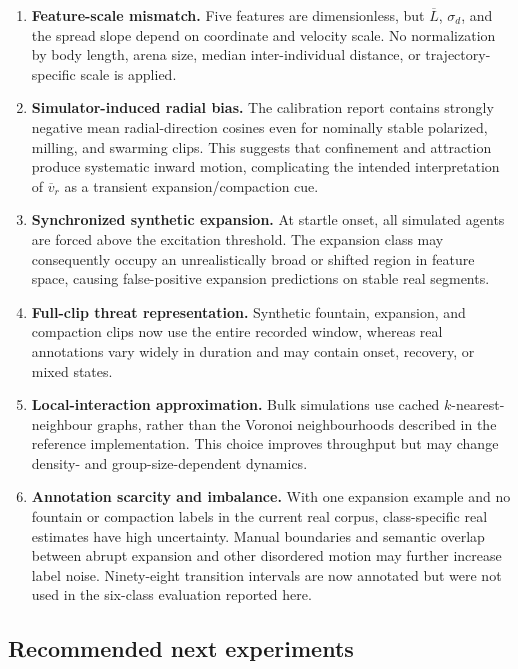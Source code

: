 \documentclass[11pt]{article}
\newcommand{\lbar}{\overline{L}}
\newcommand{\vrbar}{\overline{v}_{r}}
\newcommand{\sigmad}{\sigma_d}
\begin{document}
\begin{enumerate}[leftmargin=*]
  \item \textbf{Feature-scale mismatch.} Five features are dimensionless, but \(\lbar\), \(\sigmad\),
  and the spread slope depend on coordinate and velocity scale. No normalization by body length, arena
  size, median inter-individual distance, or trajectory-specific scale is applied.
  \item \textbf{Simulator-induced radial bias.} The calibration report contains strongly negative mean
  radial-direction cosines even for nominally stable polarized, milling, and swarming clips. This suggests
  that confinement and attraction produce systematic inward motion, complicating the intended
  interpretation of \(\vrbar\) as a transient expansion/compaction cue.
  \item \textbf{Synchronized synthetic expansion.} At startle onset, all simulated agents are forced
  above the excitation threshold. The expansion class may consequently occupy an unrealistically broad
  or shifted region in feature space, causing false-positive expansion predictions on stable real
  segments.
  \item \textbf{Full-clip threat representation.} Synthetic fountain, expansion, and compaction clips now
  use the entire recorded window, whereas real annotations vary widely in duration and may contain
  onset, recovery, or mixed states.
  \item \textbf{Local-interaction approximation.} Bulk simulations use cached \(k\)-nearest-neighbour
  graphs, rather than the Voronoi neighbourhoods described in the reference implementation. This choice
  improves throughput but may change density- and group-size-dependent dynamics.
  \item \textbf{Annotation scarcity and imbalance.} With one expansion example and no fountain or
  compaction labels in the current real corpus, class-specific real estimates have high uncertainty.
  Manual boundaries and semantic overlap between abrupt expansion and other disordered motion may
  further increase label noise. Ninety-eight transition intervals are now annotated but were not used in
  the six-class evaluation reported here.
\end{enumerate}

\subsection{Recommended next experiments}
\end{document}
